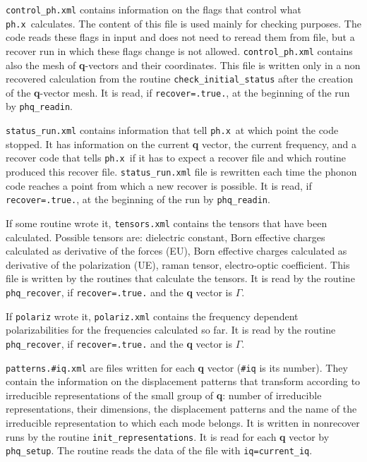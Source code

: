 \documentclass[12pt,a4paper]{article}
\def\phx{\texttt{ph.x}}
\begin{document}
\texttt{control\_ph.xml} contains information on the flags that control
what \phx\ calculates. The content of this file is used mainly for 
checking purposes. The code reads these flags in input and does not need
to reread them from file, but a recover run in which these flags change 
is not allowed. \texttt{control\_ph.xml} contains also the mesh of 
{\bf q}-vectors and their coordinates. This file is written only in a non 
recovered calculation from the routine \texttt{check\_initial\_status} after 
the creation of the {\bf q}-vector mesh. It is read, if 
\texttt{recover=.true.}, at the beginning of 
the run by \texttt{phq\_readin}.

\texttt{status\_run.xml} contains information that tell \phx\ 
at which point the code stopped. It has information on the current 
{\bf q} vector, the current frequency, and a recover code that tells 
\phx\ if it has to expect a recover file and which routine produced this 
recover file. 
\texttt{status\_run.xml} file is rewritten each time the phonon code 
reaches a point from which a new recover is possible.
It is read, if \texttt{recover=.true.},
at the beginning of the run by \texttt{phq\_readin}.

If some routine wrote it, \texttt{tensors.xml} contains the tensors that
have been calculated. Possible tensors are: dielectric constant, 
Born effective charges calculated as derivative of the forces (EU), 
Born effective charges calculated as derivative of the polarization (UE), 
raman tensor, electro-optic coefficient. This file is written by the 
routines that calculate the tensors. 
It is read by the routine \texttt{phq\_recover}, if \texttt{recover=.true.} 
and the {\bf q} vector is $\Gamma$.

If \texttt{polariz} wrote it, \texttt{polariz.xml} contains the frequency
dependent polarizabilities for the frequencies calculated so far. 
It is read by the routine 
\texttt{phq\_recover}, if \texttt{recover=.true.} and the {\bf q} vector
is $\Gamma$.

\texttt{patterns.\#iq.xml} are files written for each {\bf q} vector 
(\texttt{\#iq} is its number).
They contain the information on the displacement patterns that 
transform according to irreducible representations of the small 
group of {\bf q}: number of irreducible representations, their dimensions, 
the displacement patterns and the name of the irreducible representation 
to which each mode belongs. It is written in nonrecover runs by the routine 
\texttt{init\_representations}.
It is read for each {\bf q} vector by \texttt{phq\_setup}. The routine
reads the data of the file with \texttt{iq=current\_iq}.
\end{document}
